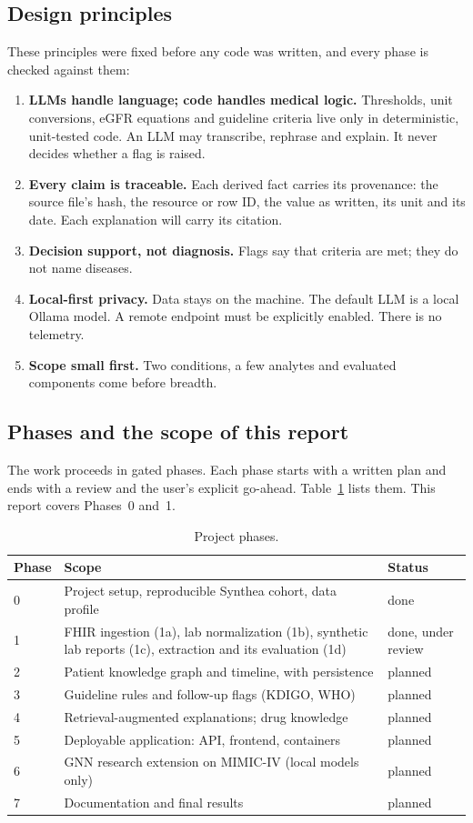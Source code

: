 \documentclass[11pt,a4paper]{article}
\begin{document}
\subsection{Design principles}
These principles were fixed before any code was written, and every phase is checked against them:
\begin{enumerate}
  \item \textbf{LLMs handle language; code handles medical logic.} Thresholds, unit conversions, eGFR equations and guideline criteria live only in deterministic, unit-tested code. An LLM may transcribe, rephrase and explain. It never decides whether a flag is raised.
  \item \textbf{Every claim is traceable.} Each derived fact carries its provenance: the source file's hash, the resource or row ID, the value as written, its unit and its date. Each explanation will carry its citation.
  \item \textbf{Decision support, not diagnosis.} Flags say that criteria are met; they do not name diseases.
  \item \textbf{Local-first privacy.} Data stays on the machine. The default LLM is a local Ollama model. A remote endpoint must be explicitly enabled. There is no telemetry.
  \item \textbf{Scope small first.} Two conditions, a few analytes and evaluated components come before breadth.
\end{enumerate}

\subsection{Phases and the scope of this report}
The work proceeds in gated phases. Each phase starts with a written plan and ends with a review and the user's explicit go-ahead. Table~\ref{tab:phases} lists them. This report covers Phases~0 and~1.

\begin{table}[h]
\centering\small
\begin{tabularx}{\linewidth}{@{}lXl@{}}
\toprule
Phase & Scope & Status \\
\midrule
0 & Project setup, reproducible Synthea cohort, data profile & done \\
1 & FHIR ingestion (1a), lab normalization (1b), synthetic lab reports (1c), extraction and its evaluation (1d) & done, under review \\
2 & Patient knowledge graph and timeline, with persistence & planned \\
3 & Guideline rules and follow-up flags (KDIGO, WHO) & planned \\
4 & Retrieval-augmented explanations; drug knowledge & planned \\
5 & Deployable application: API, frontend, containers & planned \\
6 & GNN research extension on MIMIC-IV (local models only) & planned \\
7 & Documentation and final results & planned \\
\bottomrule
\end{tabularx}
\caption{Project phases.}
\label{tab:phases}
\end{table}
\end{document}
